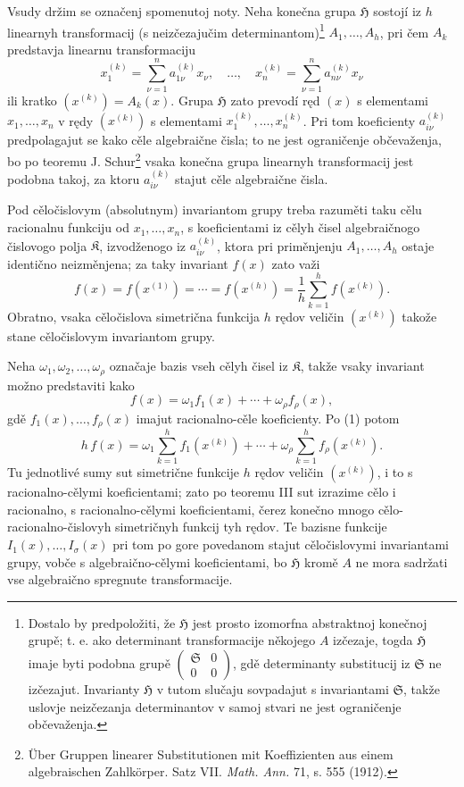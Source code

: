 \documentclass[11pt]{article}
\providecommand{\frH}{\mathfrak H}
\providecommand{\frK}{\mathfrak K}
\providecommand{\frS}{\mathfrak S}
\begin{document}
Vsudy držim se označenj spomenutoj noty. Neha konečna grupa \(\frH\) sostojí iz \(h\) linearnyh transformacij (s neizčezajučim determinantom)\footnote{Dostalo by predpoložiti, že \(\frH\) jest prosto izomorfna abstraktnoj konečnoj grupě; t. e. ako determinant transformacije někojego \(A\) izčezaje, togda \(\frH\) imaje byti podobna grupě \(\begin{pmatrix}\frS&0\\0&0\end{pmatrix}\), gdě determinanty substitucij iz \(\frS\) ne izčezajut. Invarianty \(\frH\) v tutom slučaju sovpadajut s invariantami \(\frS\), takže uslovje neizčezanja determinantov v samoj stvari ne jest ograničenje občevaženja.} \(A_1,\ldots,A_h\), pri čem \(A_k\) predstavja linearnu transformaciju
\[
        x_1^{(k)}=\sum_{\nu=1}^{n}a_{1\nu}^{(k)}x_\nu,
        \quad\ldots,\quad
        x_n^{(k)}=\sum_{\nu=1}^{n}a_{n\nu}^{(k)}x_\nu
\]
ili kratko \((x^{(k)})=A_k(x)\). Grupa \(\frH\) zato prevodí ręd \((x)\) s elementami \(x_1,\ldots,x_n\) v rędy \((x^{(k)})\) s elementami \(x_1^{(k)},\ldots,x_n^{(k)}\). Pri tom koeficienty \(a_{i\nu}^{(k)}\) predpolagajut se kako cěle algebraične čisla; to ne jest ograničenje občevaženja, bo po teoremu J. Schur\footnote{Über Gruppen linearer Substitutionen mit Koeffizienten aus einem algebraischen Zahlkörper. Satz VII. \emph{Math. Ann.} 71, s. 555 (1912).} vsaka konečna grupa linearnyh transformacij jest podobna takoj, za ktoru \(a_{i\nu}^{(k)}\) stajut cěle algebraične čisla.

Pod cěločislovym (absolutnym) invariantom grupy treba razuměti taku cělu racionalnu funkciju od \(x_1,\ldots,x_n\), s koeficientami iz cělyh čisel algebraičnogo čislovogo polja \(\frK\), izvodženogo iz \(a_{i\nu}^{(k)}\), ktora pri priměnjenju \(A_1,\ldots,A_h\) ostaje identično neizměnjena; za taky invariant \(f(x)\) zato važi
\begin{equation}
        f(x)=f(x^{(1)})=\cdots=f(x^{(h)})
        =\frac1h\sum_{k=1}^{h}f(x^{(k)}).
\end{equation}
Obratno, vsaka cěločislova simetrična funkcija \(h\) rędov veličin \((x^{(k)})\) takože stane cěločislovym invariantom grupy.

Neha \(\omega_1,\omega_2,\ldots,\omega_\rho\) označaje bazis vseh cělyh čisel iz \(\frK\), takže vsaky invariant možno predstaviti kako
\[
        f(x)=\omega_1 f_1(x)+\cdots+\omega_\rho f_\rho(x),
\]
gdě \(f_1(x),\ldots,f_\rho(x)\) imajut racionalno-cěle koeficienty. Po (1) potom
\[
        h\,f(x)
        =
        \omega_1\sum_{k=1}^{h}f_1(x^{(k)})
        +\cdots+
        \omega_\rho\sum_{k=1}^{h}f_\rho(x^{(k)}).
\]
Tu jednotlivé sumy sut simetrične funkcije \(h\) rędov veličin \((x^{(k)})\), i to s racionalno-cělymi koeficientami; zato po teoremu III sut izrazime cělo i racionalno, s racionalno-cělymi koeficientami, čerez konečno mnogo cělo-racionalno-čislovyh simetričnyh funkcij tyh rędov. Te bazisne funkcije \(I_1(x),\ldots,I_\sigma(x)\) pri tom po gore povedanom stajut cěločislovymi invariantami grupy, vobče s algebraično-cělymi koeficientami, bo \(\frH\) kromě \(A\) ne mora sadržati vse algebraično spregnute transformacije.
\end{document}
